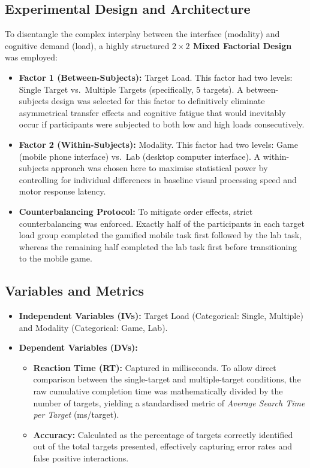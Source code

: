 \documentclass[11pt,a4paper]{article}
\begin{document}
\subsection{Experimental Design and Architecture}
To disentangle the complex interplay between the interface (modality) and cognitive demand (load), a highly structured \textbf{$2 \times 2$ Mixed Factorial Design} was employed:
\begin{itemize}
    \item \textbf{Factor 1 (Between-Subjects):} Target Load. This factor had two levels: Single Target vs.\ Multiple Targets (specifically, 5 targets). A between-subjects design was selected for this factor to definitively eliminate asymmetrical transfer effects and cognitive fatigue that would inevitably occur if participants were subjected to both low and high loads consecutively.
    \item \textbf{Factor 2 (Within-Subjects):} Modality. This factor had two levels: Game (mobile phone interface) vs.\ Lab (desktop computer interface). A within-subjects approach was chosen here to maximise statistical power by controlling for individual differences in baseline visual processing speed and motor response latency.
    \item \textbf{Counterbalancing Protocol:} To mitigate order effects, strict counterbalancing was enforced. Exactly half of the participants in each target load group completed the gamified mobile task first followed by the lab task, whereas the remaining half completed the lab task first before transitioning to the mobile game.
\end{itemize}

\subsection{Variables and Metrics}
\begin{itemize}
    \item \textbf{Independent Variables (IVs):} Target Load (Categorical: Single, Multiple) and Modality (Categorical: Game, Lab).
    \item \textbf{Dependent Variables (DVs):}
    \begin{itemize}
        \item \textbf{Reaction Time (RT):} Captured in milliseconds. To allow direct comparison between the single-target and multiple-target conditions, the raw cumulative completion time was mathematically divided by the number of targets, yielding a standardised metric of \textit{Average Search Time per Target} (ms/target).
        \item \textbf{Accuracy:} Calculated as the percentage of targets correctly identified out of the total targets presented, effectively capturing error rates and false positive interactions.
    \end{itemize}
\end{itemize}
\end{document}
